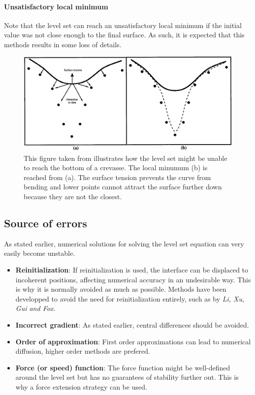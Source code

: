 \documentclass{article}
\begin{document}

\paragraph{Unsatisfactory local minimum}
Note that the level set can reach an unsatisfactory local minimum if the initial
value was not close enough to the final surface. As such, it is expected that
this methods results in some loss of details.

\begin{figure}[H]
  \centering
  \includegraphics[width=1.0\textwidth]{img/savadjiev3_3.png}
  \caption{This figure taken from \cite{savadjiev2003surface} illustrates
  how the level set might be unable to reach the bottom of a crevasse. The local
  minumum (b) is reached from (a). The surface tension prevents the curve from
  bending and lower points cannot attract the surface further down because they
  are not the closest.}    
\end{figure}

\subsection{Source of errors}
As stated earlier, numerical solutions for solving the level set equation can
very easily become unstable.
\begin{itemize}
    \item \textbf{Reinitialization}: If reinitialization is used, the interface
        can be displaced to incoherent positions, affecting numerical accuracy
        in an undesirable way. This is why it is normally avoided as much as
        possible. Methods have been developped to avoid the need for
        reinitialization entirely, such as \cite{li2010distance} by \emph{Li,
        Xu, Gui and Fox}.
    \item \textbf{Incorrect gradient}: As stated earlier, central differences
        should be avoided.
    \item \textbf{Order of approximation}: First order approximations can lead
        to numerical diffusion, higher order methods are prefered.
    \item \textbf{Force (or speed) function}: The force function might be
        well-defined around the level set but has no guarantees of stability
        further out. This is why a force extension strategy can be used. 
\end{itemize}



\end{document}
